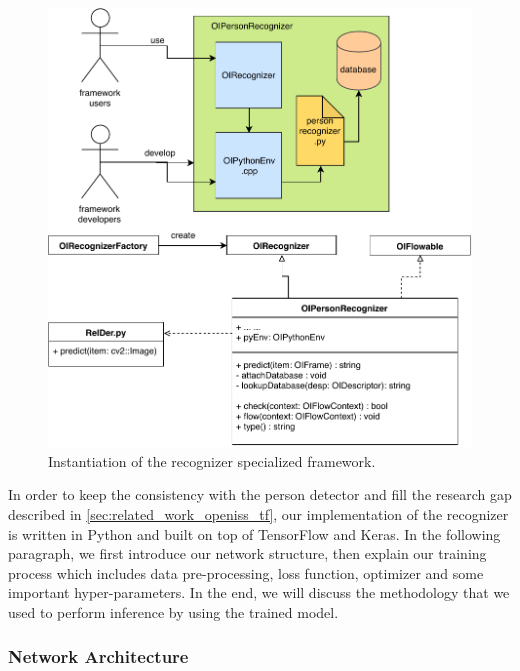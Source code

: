 \begin{figure}
    \centering
    \includegraphics[scale=0.8]{figures/framework_inst_recognizer.pdf}
    \caption{Instantiation of the recognizer specialized framework.}
    \label{fig:fw-inst-recognizer}
\end{figure}

In order to keep the consistency with the person detector and fill the
research gap described in \autoref{sec:related_work_openiss_tf}, our 
implementation of the recognizer is written in Python and built on top of 
TensorFlow and Keras.
In the following paragraph, we first introduce our network structure, then
explain our training process which includes data pre-processing, loss 
function,  optimizer and some important hyper-parameters.
In the end, we will discuss the methodology that we used to perform inference
by using the trained model.

\subsubsection{Network Architecture}
\label{fw-recognizer-spec-network-arch}


